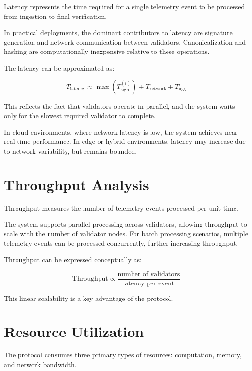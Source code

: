 Latency represents the time required for a single telemetry event to be processed from ingestion to final verification.

In practical deployments, the dominant contributors to latency are signature generation and network communication between validators. Canonicalization and hashing are computationally inexpensive relative to these operations.

The latency can be approximated as:

\begin{equation}
T_{\text{latency}} \approx \max(T_{\text{sign}}^{(i)}) + T_{\text{network}} + T_{\text{agg}}
\end{equation}

This reflects the fact that validators operate in parallel, and the system waits only for the slowest required validator to complete.

In cloud environments, where network latency is low, the system achieves near real-time performance. In edge or hybrid environments, latency may increase due to network variability, but remains bounded.

\section{Throughput Analysis}

Throughput measures the number of telemetry events processed per unit time.

The system supports parallel processing across validators, allowing throughput to scale with the number of validator nodes. For batch processing scenarios, multiple telemetry events can be processed concurrently, further increasing throughput.

Throughput can be expressed conceptually as:

\begin{equation}
\text{Throughput} \propto \frac{\text{number of validators}}{\text{latency per event}}
\end{equation}

This linear scalability is a key advantage of the protocol.

\section{Resource Utilization}

The protocol consumes three primary types of resources: computation, memory, and network bandwidth.

